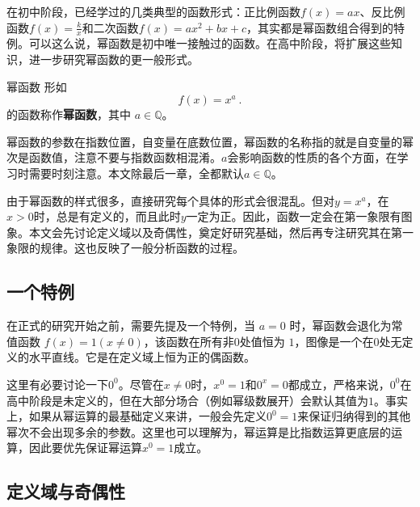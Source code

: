 
\begin{issues}
\issueDraft
\end{issues}


在初中阶段，已经学过的几类典型的函数形式：正比例函数$f(x) = ax$、反比例函数$\displaystyle f(x) = \frac{k}{x}$和二次函数$f(x) = ax^2+bx+c$，其实都是幂函数组合得到的特例。可以这么说，幂函数是初中唯一接触过的函数。在高中阶段，将扩展这些知识，进一步研究幂函数的更一般形式。

\begin{definition}{幂函数}
形如
\begin{equation}
f(x) = x^a~.
\end{equation}
的函数称作\textbf{幂函数}，其中 $a\in\mathbb Q$。
\end{definition}
幂函数的参数在指数位置，自变量在底数位置，幂函数的名称指的就是自变量的幂次是函数值，注意不要与指数函数相混淆。$a$会影响函数的性质的各个方面，在学习时需要时刻注意。本文除最后一章，全都默认$a\in\mathbb Q$。

由于幂函数的样式很多，直接研究每个具体的形式会很混乱。但对$y=x^a$，在$x>0$时，总是有定义的，而且此时$y$一定为正。因此，函数一定会在第一象限有图象。本文会先讨论定义域以及奇偶性，奠定好研究基础，然后再专注研究其在第一象限的规律。这也反映了一般分析函数的过程。

\subsection{一个特例}

在正式的研究开始之前，需要先提及一个特例，当 $a = 0$ 时，幂函数会退化为常值函数 $f(x) = 1(x\neq0)$，该函数在所有非$0$处值恒为 $1$，图像是一个在$0$处无定义的水平直线。它是在定义域上恒为正的偶函数。

这里有必要讨论一下$0^0$。尽管在$x\neq0$时，$x^0=1$和$0^x=0$都成立，严格来说，$0^0$在高中阶段是未定义的，但在大部分场合（例如幂级数展开）会默认其值为$1$。事实上，如果从幂运算的最基础定义来讲，一般会先定义$0^0=1$来保证归纳得到的其他幂次不会出现多余的参数。这里也可以理解为，幂运算是比指数运算更底层的运算，因此要优先保证幂运算$x^0=1$成立。

\subsection{定义域与奇偶性}

